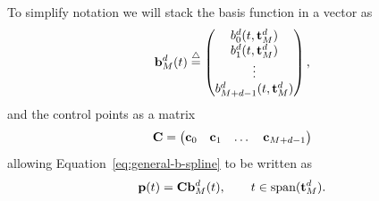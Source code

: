 To simplify notation we will stack the basis function in a vector as
\begin{equation}\label{eq:basis_vector}
\bbf_M^d(t) \defeq \begin{pmatrix} b_0^d(t, \mathbf{t}_M^d) \\ b_1^d(t, \mathbf{t}_M^d) \\ \vdots \\ b_{M+d-1}^d(t, \mathbf{t}_M^d) \end{pmatrix}, 
\end{equation}
and the control points as a matrix 
\[
\mathbf{C} = \begin{pmatrix} \mathbf{c}_0 & \mathbf{c}_1 & \dots & \mathbf{c}_{M+d-1} \end{pmatrix}
\]
allowing Equation~\eqref{eq:general-b-spline} to be written as
\[
\mathbf{p}(t) = \mathbf{C} \mathbf{b}_M^d(t), \qquad t\in\text{span}(\mathbf{t}_M^d).
\]



